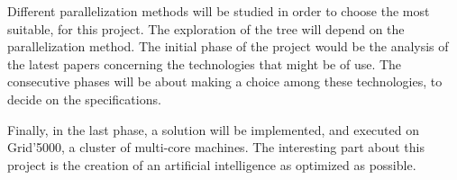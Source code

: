 Different parallelization methods will be studied in order to choose the most suitable, for this project.
The exploration of the tree will depend on the parallelization method.
The initial phase of the project would be the analysis of the latest papers concerning the technologies that might be of use.
The consecutive phases will be about making a choice among these technologies, to decide on the specifications.
\newline

Finally, in the last phase, a solution will be implemented, and executed on Grid'5000, a cluster of multi-core machines.
The interesting part about this project is the creation of an artificial intelligence as optimized as possible.